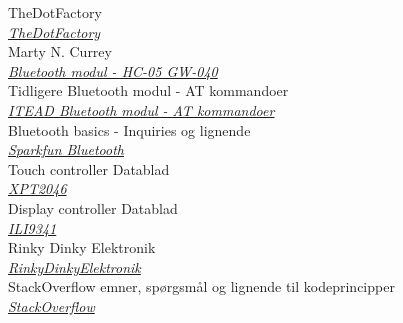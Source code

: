 \documentclass[12pt]{article}
\renewcommand{\refname}{whatever}
\begin{document}











\renewcommand\refname{Referencer}
\begin{thebibliography}{9}
	 TheDotFactory \\
	\textit{\href{http://www.eran.io/the-dot-factory-an-lcd-font-and-image-generator/}{TheDotFactory}}\\ 
	
	Marty N. Currey \\
	\textit{\href{http://www.martyncurrey.com/arduino-with-hc-05-bluetooth-module-at-mode}{Bluetooth modul - HC-05 GW-040}
	}	\\

	Tidligere Bluetooth modul - AT kommandoer \\
	\textit{\href{http://store.iteadstudio.com/images/produce/Shield/BTshieldv2.2/BTShieldV2.2_DS.pdf}{ITEAD Bluetooth modul - AT kommandoer}
	}	\\

	Bluetooth basics - Inquiries og lignende \\
	\textit{\href{https://learn.sparkfun.com/tutorials/bluetooth-basics}{Sparkfun Bluetooth}
	}	\\
	
	Touch controller Datablad \\
	\textit{\href{https://www.buydisplay.com/download/ic/XPT2046.pdf}{XPT2046}
	}\\
	
	Display controller Datablad \\
	\textit{\href{https://cdn-shop.adafruit.com/datasheets/ILI9341.pdf}{ILI9341}
	}	\\
	Rinky Dinky Elektronik \\
	\textit{\href{http://www.rinkydinkelectronics.com/library.php}{RinkyDinkyElektronik}
	}	\\

	StackOverflow emner, spørgsmål og lignende til kodeprincipper \\
	\textit{\href{stackoverflow.com}{StackOverflow}
	}	\\

	
\end{thebibliography}
\end{document}

